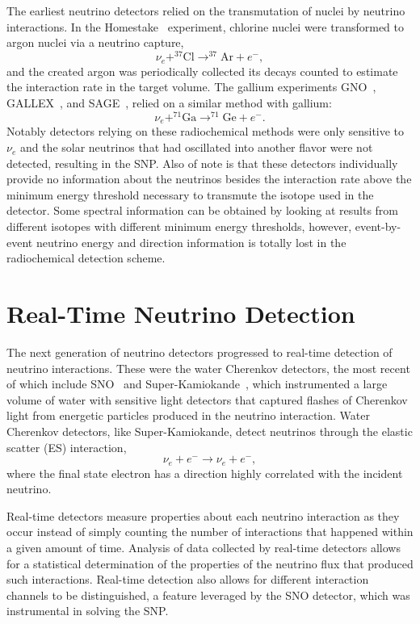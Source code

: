 The earliest neutrino detectors relied on the transmutation of nuclei by neutrino interactions. 
In the Homestake~\cite{homestake} experiment, chlorine nuclei were transformed to argon nuclei via a neutrino capture,
\begin{equation}
\nu_e + ^{37}\mathrm{Cl} \rightarrow ^{37}\mathrm{Ar} + e^-,
\end{equation}
and the created argon was periodically collected its decays counted to estimate the interaction rate in the target volume.
The gallium experiments GNO~\cite{gno}, GALLEX~\cite{gallex}, and SAGE~\cite{sagecombo}, relied on a similar method with gallium:
\begin{equation}
\nu_e + ^{71}\mathrm{Ga} \rightarrow ^{71}\mathrm{Ge} + e^-.
\end{equation}
Notably detectors relying on these radiochemical methods were only sensitive to $\nu_e$ and the solar neutrinos that had oscillated into another flavor were not detected, resulting in the SNP.
Also of note is that these detectors individually provide no information about the neutrinos besides the interaction rate above the minimum energy threshold necessary to transmute the isotope used in the detector. 
Some spectral information can be obtained by looking at results from different isotopes with different minimum energy thresholds, however, event-by-event neutrino energy and direction information is totally lost in the radiochemical detection scheme.

\section{Real-Time Neutrino Detection}

The next generation of neutrino detectors progressed to real-time detection of neutrino interactions.
These were the water Cherenkov detectors, the most recent of which include SNO~\cite{sno} and Super-Kamiokande~\cite{superk}, which instrumented a large volume of water with sensitive light detectors that captured flashes of Cherenkov light from energetic particles produced in the neutrino interaction.
Water Cherenkov detectors, like Super-Kamiokande, detect neutrinos through the elastic scatter (ES) interaction,
\begin{equation}
\nu_e + e^- \rightarrow \nu_e + e^-,
\end{equation}
where the final state electron has a direction highly correlated with the incident neutrino.

Real-time detectors measure properties about each neutrino interaction as they occur instead of simply counting the number of interactions that happened within a given amount of time.
Analysis of data collected by real-time detectors allows for a statistical determination of the properties of the neutrino flux that produced such interactions.
Real-time detection also allows for different interaction channels to be distinguished, a feature leveraged by the SNO detector, which was instrumental in solving the SNP.

